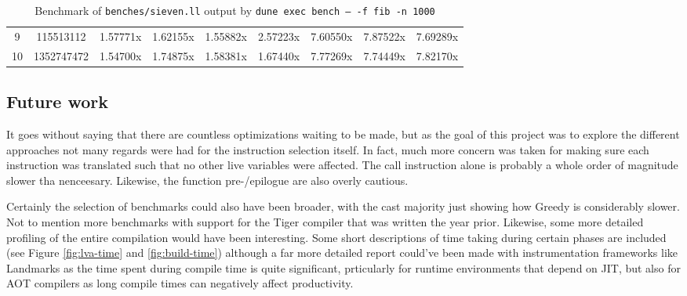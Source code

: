 \documentclass{article}
\begin{document}
\begin{table}[H]
{\begin{NiceTabular}{|c|cccccccc|}
9 &  115513112&  1.57771x&  1.62155x&  1.55882x&  2.57223x&  7.60550x&  7.87522x&  7.69289x\\
10 &  1352747472&  1.54700x&  1.74875x&  1.58381x&  1.67440x&  7.77269x&  7.74449x&  7.82170x\\
\hline
\end{NiceTabular}}
\caption{\label{tab:fannkuch}Benchmark of \texttt{benches/sieven.ll} output by \texttt{dune exec bench -- -f fib -n 1000}}
\end{table}







\subsection{Future work}

It goes without saying that there are countless optimizations waiting to be made, but as the goal of this project was to explore the different approaches not many regards were had for the instruction selection itself. In fact, much more concern was taken for making sure each instruction was translated such that no other live variables were affected. The call instruction alone is probably a whole order of magnitude slower tha nenceesary. Likewise, the function pre-/epilogue are also overly cautious.

Certainly the selection of benchmarks could also have been broader, with the cast majority just showing how Greedy is considerably slower. Not to mention more benchmarks with support for the Tiger compiler that was written the year prior. Likewise, some more detailed profiling of the entire compilation would have been interesting. Some short descriptions of time taking during certain phases are included (see Figure \ref{fig:lva-time} and \ref{fig:build-time}) although a far more detailed report could've been made with instrumentation frameworks like Landmarks \cite{landmarks} as the time spent during compile time is quite significant, prticularly for runtime environments that depend on JIT, but also for AOT compilers as long compile times can negatively affect productivity.
\end{document}
